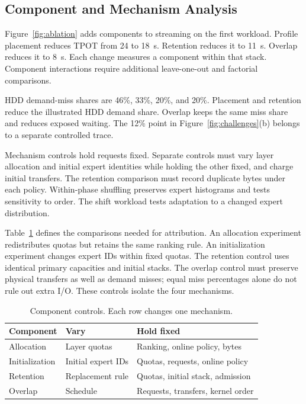 \documentclass[conference,9pt,letterpaper]{IEEEtran}
\begin{document}
\subsection{Component and Mechanism Analysis}
\label{sec:mechanisms}
Figure~\ref{fig:ablation} adds components to streaming on the first workload. Profile placement reduces TPOT from 24 to 18~s. Retention reduces it to 11~s. Overlap reduces it to 8~s. Each change measures a component within that stack. Component interactions require additional leave-one-out and factorial comparisons.

HDD demand-miss shares are 46\%, 33\%, 20\%, and 20\%. Placement and retention reduce the illustrated HDD demand share. Overlap keeps the same miss share and reduces exposed waiting. The 12\% point in Figure~\ref{fig:challenges}(b) belongs to a separate controlled trace.

Mechanism controls hold requests fixed. Separate controls must vary layer allocation and initial expert identities while holding the other fixed, and charge initial transfers. The retention comparison must record duplicate bytes under each policy. Within-phase shuffling preserves expert histograms and tests sensitivity to order. The shift workload tests adaptation to a changed expert distribution.

Table~\ref{tab:controls} defines the comparisons needed for attribution. An allocation experiment redistributes quotas but retains the same ranking rule. An initialization experiment changes expert IDs within fixed quotas. The retention control uses identical primary capacities and initial stacks. The overlap control must preserve physical transfers as well as demand misses; equal miss percentages alone do not rule out extra I/O. These controls isolate the four mechanisms.

\begin{table}[t]
\caption{Component controls. Each row changes one mechanism.}
\label{tab:controls}\centering
\begin{tabular}{@{}p{}p{}p{}@{}}\toprule
Component & Vary & Hold fixed\\\midrule
Allocation & Layer quotas & Ranking, online policy, bytes\\
Initialization & Initial expert IDs & Quotas, requests, online policy\\
Retention & Replacement rule & Quotas, initial stack, admission\\
Overlap & Schedule & Requests, transfers, kernel order\\\bottomrule
\end{tabular}
\end{table}
\end{document}
